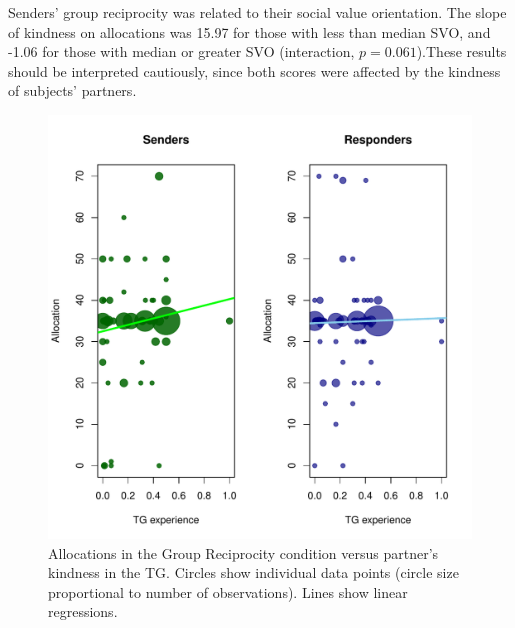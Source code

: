 \documentclass[12pt,a4paper]{article}
\makeatletter
\def\maxwidth{ %
  \ifdim\Gin@nat@width>\linewidth
    \linewidth
  \else
    \Gin@nat@width
  \fi
}
\newenvironment{knitrout}{}{} %
\makeatother
\begin{document}

Senders' group reciprocity was related to their social value orientation. The slope of kindness on allocations was 
15.97 for those with less than median SVO, and 
-1.06 for those with median or greater SVO 
(interaction, $p= 0.061$).These results should be interpreted cautiously, since both scores were 
affected by the kindness of subjects' partners. 

\begin{knitrout}
\color{fgcolor}\begin{figure}
\includegraphics[width=\maxwidth]{figure/plots-1} \caption[Allocations in the Group Reciprocity condition versus partner's kindness in the TG]{Allocations in the Group Reciprocity condition versus partner's kindness in the TG. Circles show individual data points (circle size proportional to number of observations). Lines show linear regressions.}\label{fig:plots}
\end{figure}


\end{knitrout}
\end{document}
